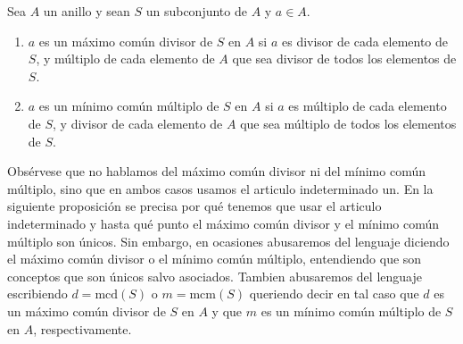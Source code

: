 \begin{definition}{}{}
Sea \(A\) un anillo y sean \(S\) un subconjunto de \(A\) y \(a \in A\).

\begin{enumerate}
    \item \(a\) es un máximo común divisor de \(S\) en \(A\) si \(a\) es divisor de cada elemento de \(S\), y múltiplo de cada elemento de \(A\) que sea divisor de todos los elementos de \(S\).

    \item \(a\) es un mínimo común múltiplo de \(S\) en \(A\) si \(a\) es múltiplo de cada elemento de \(S\), y divisor de cada elemento de \(A\) que sea múltiplo de todos los elementos de \(S\).
\end{enumerate}
\end{definition}

Obsérvese que no hablamos del máximo común divisor ni del mínimo común múltiplo, sino que en ambos casos usamos el articulo indeterminado un. En la siguiente proposición se precisa por qué tenemos que usar el articulo indeterminado y hasta qué punto el máximo común divisor y el mínimo común múltiplo son únicos. Sin embargo, en ocasiones abusaremos del lenguaje diciendo el máximo común divisor o el mínimo común múltiplo, entendiendo que son conceptos que son únicos salvo asociados. Tambien abusaremos del lenguaje escribiendo \(d = \mathrm{mcd}(S)\) o \(m = \mathrm{mcm}(S)\) queriendo decir en tal caso que \(d\) es un máximo común divisor de \(S\) en \(A\) y que \(m\) es un mínimo común múltiplo de \(S\) en \(A\), respectivamente.

